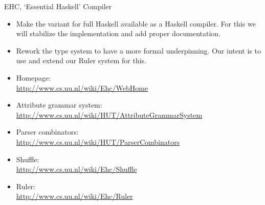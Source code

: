 \documentclass{article}
\begin{document}
\begin{hcarentry}{EHC, `Essential Haskell' Compiler}
\begin{itemize}
\item
  Make the variant for full Haskell available as a Haskell compiler.
  For this we will stabilize the implementation and add proper documentation.
\item
  Rework the type system to have a more formal underpinning.
  Our intent is to use and extend our Ruler system for this.
\end{itemize}

\FurtherReading
\begin{itemize}
\item Homepage:\\
\url{http://www.cs.uu.nl/wiki/Ehc/WebHome}

\item Attribute grammar system:\\
\url{http://www.cs.uu.nl/wiki/HUT/AttributeGrammarSystem}

\item Parser combinators:\\
\url{http://www.cs.uu.nl/wiki/HUT/ParserCombinators}

\item Shuffle:\\
\url{http://www.cs.uu.nl/wiki/Ehc/Shuffle}

\item Ruler:\\
\url{http://www.cs.uu.nl/wiki/Ehc/Ruler}
\end{itemize}

\end{hcarentry}
\end{document}
